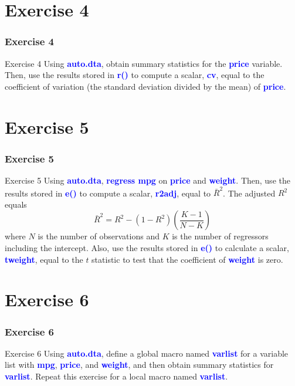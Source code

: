 \documentclass[11pt, aspectratio=169]{beamer}
\begin{document}
	\section{Exercise 4}
		\begin{frame}
			\frametitle{Exercise 4}
			\begin{block}{Exercise 4}
				Using \textcolor{blue}{\textbf{auto.dta}}, obtain summary statistics for the \textcolor{blue}{\textbf{price}} variable.
				Then, use the results stored in \textcolor{blue}{\textbf{r()}} to compute a scalar, \textcolor{blue}{\textbf{cv}}, equal to the
				coefficient of variation (the standard deviation divided by the mean) of \textcolor{blue}{\textbf{price}}.
			\end{block}
		\end{frame}
	\section{Exercise 5}
		\begin{frame}
			\frametitle{Exercise 5}
			\begin{block}{Exercise 5}
				Using \textcolor{blue}{\textbf{auto.dta}}, \textcolor{blue}{\textbf{regress mpg}} on \textcolor{blue}{\textbf{price}} and \textcolor{blue}{\textbf{weight}}. Then, use the
				results stored in \textcolor{blue}{\textbf{e()}} to compute a scalar, \textcolor{blue}{\textbf{r2adj}}, equal to $\bar{R}^{2}$.
				The adjusted $R^{2}$ equals 
					\begin{equation*}
						\bar{R}^{2} = R^{2} - (1 - R^{2}) \left(\dfrac{K-1}{N - K}\right)
					\end{equation*}
				where $N$ is the number of observations and $K$ is the number of regressors including
				the intercept. Also, use the results stored in \textcolor{blue}{\textbf{e()}} to calculate a scalar,
				\textcolor{blue}{\textbf{tweight}}, equal to the $t$ statistic to test that the coefficient of \textcolor{blue}{\textbf{weight}} is zero.
			\end{block}
		\end{frame}
	\section{Exercise 6}
		\begin{frame}
			\frametitle{Exercise 6}
			\begin{block}{Exercise 6}
				Using \textcolor{blue}{\textbf{auto.dta}}, define a global macro named \textcolor{blue}{\textbf{varlist}} for a variable
				list with \textcolor{blue}{\textbf{mpg}}, \textcolor{blue}{\textbf{price}}, and \textcolor{blue}{\textbf{weight}}, and then obtain summary statistics
				for \textcolor{blue}{\textbf{varlist}}. Repeat this exercise for a local macro named \textcolor{blue}{\textbf{varlist}}.
			\end{block}
		\end{frame}
\end{document}
